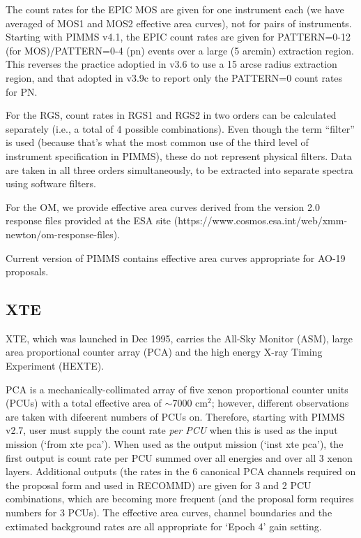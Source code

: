 \documentclass[11pt]{article}
\begin{document}
The count rates for the EPIC MOS are given for one instrument each (we have
averaged of MOS1 and MOS2 effective area curves), not for pairs of instruments.
Starting with PIMMS v4.1, the EPIC count rates are given for PATTERN=0-12
(for MOS)/PATTERN=0-4 (pn) events over a large (5 arcmin) extraction region.
This reverses the practice adoptied in v3.6 to use a 15 arcse radius
extraction region, and that adopted in v3.9c to report only the PATTERN=0
count rates for PN.

For the RGS, count rates in RGS1 and RGS2 in two orders can be calculated
separately (i.e., a total of 4 possible combinations).
Even though the term ``filter'' is used (because that's what the most
common use of the third level of instrument specification in PIMMS),
these do not represent physical filters.  Data are taken in all three
orders simultaneously, to be extracted into separate spectra using
software filters.

For the OM, we provide effective area curves derived from the version 2.0
response files provided at the ESA site
(https://www.cosmos.esa.int/web/xmm-newton/om-response-files).

Current version of PIMMS contains effective area curves appropriate for
AO-19 proposals.

\subsection{XTE}

XTE, which was launched in Dec 1995,
carries the All-Sky Monitor (ASM), large area proportional counter array
(PCA) and the high energy X-ray Timing Experiment (HEXTE).

PCA is a mechanically-collimated array of five xenon proportional counter
units (PCUs) with a total effective area of $\sim$7000 cm$^2$; however,
different observations are taken with difeerent numbers of PCUs on.  Therefore,
starting with PIMMS v2.7, user must supply the count rate {\sl per PCU\/}
when this is used as the input mission (`from xte pca').  When used as the
output mission (`inst xte pca'), the first output is count rate per PCU summed
over all energies and over all 3 xenon layers.  Additional outputs (the rates
in the 6 canonical PCA channels required on the proposal form and used in
RECOMMD) are given for 3 and 2 PCU combinations, which are becoming more
frequent (and the proposal form requires numbers for 3 PCUs).  The effective
area curves, channel boundaries and the extimated background rates are all
appropriate for `Epoch 4' gain setting.
\end{document}
